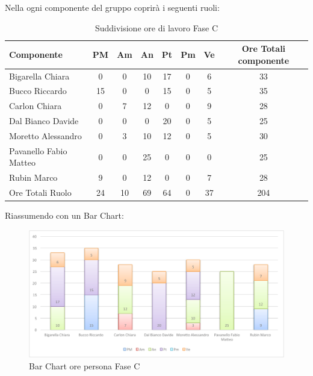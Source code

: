 				Nella  ogni componente del gruppo \groupname{} coprirà i seguenti ruoli:
				\begin{table}[H]
					\begin{center}
						\begin{tabular}{| l | c | c | c | c | c | c | c |}
							\hline
							Componente 				& PM	& Am	 & An 	& Pt 		& Pm 	& Ve 	& Ore Totali componente \\ \hline
							
							Bigarella Chiara 			& 0		& 0		& 10 		& 17 		& 0		& 6 		& 33 \\
							Bucco Riccardo 			& 15 		& 0		& 0		& 15 		& 0		& 5 		& 35 \\
							Carlon Chiara	 			& 0		& 7 		& 12 		& 0		& 0		& 9 		& 28 \\
							Dal Bianco Davide 			& 0		& 0		& 0		& 20 		& 0		& 5		& 25 \\
							Moretto Alessandro 			& 0		& 3 		& 10 		& 12 		& 0		& 5 		& 30 \\
							Pavanello Fabio Matteo	 	& 0		& 0		& 25 		& 0		& 0		& 0		& 25 \\
							Rubin Marco				& 9 		& 0		& 12 		& 0		& 0		& 7 		& 28 \\ \hline \hline
							
							Ore Totali Ruolo 			& 24 		& 10 		& 69 		& 64 		& 0		& 37		& 204\\ \hline
						\end{tabular}
					\end{center}
					\caption{Suddivisione ore di lavoro Fase C}
				\end{table}
				Riassumendo con un Bar Chart:
				\begin{figure}[H]\centering
					\includegraphics[width=\textwidth]{PianoDiProgetto/Pics/ChartOreFaseC.pdf}
					\caption{Bar Chart ore persona Fase C}
				\end{figure}
